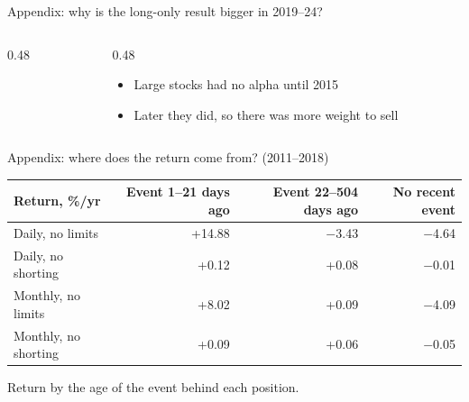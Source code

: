 \documentclass[aspectratio=169,11pt]{beamer}
\begin{document}
\begin{frame}{Appendix: why is the long-only result bigger in 2019--24?}
\begin{columns}[T]
\begin{column}{0.48\textwidth}
\centering
\scriptsize
{}
\end{column}
\begin{column}{0.48\textwidth}
\footnotesize
\begin{itemize}
\item Large stocks had no alpha until 2015
\item Later they did, so there was more weight to sell
\end{itemize}
\end{column}
\end{columns}
\end{frame}

\begin{frame}{Appendix: where does the return come from? (2011--2018)}
\centering
\small
\begin{tabular}{lrrr}
\toprule
Return, \%/yr & Event 1--21 days ago & Event 22--504 days ago & No recent event \\
\midrule
Daily, no limits & +14.88 & $-$3.43 & $-$4.64 \\
Daily, no shorting & +0.12 & +0.08 & $-$0.01 \\
Monthly, no limits & +8.02 & +0.09 & $-$4.09 \\
Monthly, no shorting & +0.09 & +0.06 & $-$0.05 \\
\bottomrule
\end{tabular}

\medskip
\raggedright\footnotesize Return by the age of the event behind each position.
\end{frame}
\end{document}
